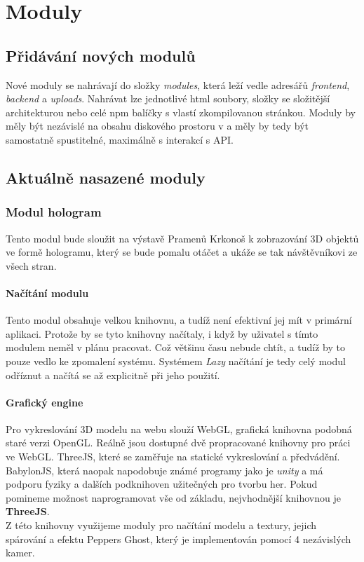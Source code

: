 \chapter{Moduly}

\section{Přidávání nových modulů}
Nové moduly se nahrávají do složky \textit{modules},
která leží vedle adresářů \textit{frontend}, \textit{backend} a \textit{uploads}.
Nahrávat lze jednotlivé html soubory, složky se složitější architekturou nebo
celé npm balíčky s vlastí zkompilovanou stránkou. Moduly by měly být nezávislé na
obsahu diskového prostoru v  a měly by tedy být samostatně spustitelné,
maximálně s interakcí s API.

\section{Aktuálně nasazené moduly}

\subsection{Modul hologram}
Tento modul bude sloužit na výstavě Pramenů Krkonoš k zobrazování 3D objektů ve formě hologramu,
který se bude pomalu otáčet a ukáže se tak návštěvníkovi ze všech stran.

\subsubsection{Načítání modulu}
Tento modul obsahuje velkou knihovnu, a tudíž není efektivní jej mít v primární aplikaci.
Protože by se tyto knihovny načítaly, i když by uživatel s tímto modulem neměl v plánu pracovat.
Což většinu času nebude chtít, a tudíž by to pouze vedlo ke zpomalení systému.
Systémem \textit{Lazy} načítání je tedy celý modul odříznut a načítá se až explicitně při jeho použití.

\subsubsection{Grafický engine}
Pro vykreslování 3D modelu na webu slouží WebGL, grafická knihovna podobná staré verzi OpenGL.
Reálně jsou dostupné dvě propracované knihovny pro práci ve WebGL.
ThreeJS, které se zaměřuje na statické vykreslování a předvádění.
BabylonJS, která naopak napodobuje známé programy jako je \textit{unity} a má podporu
fyziky a dalších podknihoven užitečných pro tvorbu her.
Pokud pomineme možnost naprogramovat vše od základu, nejvhodnější knihovnou 
je \textbf{ThreeJS}.\\
Z této knihovny využijeme moduly pro načítání modelu a textury, jejich spárování a
efektu Peppers Ghost, který je implementován pomocí 4 nezávislých kamer.


